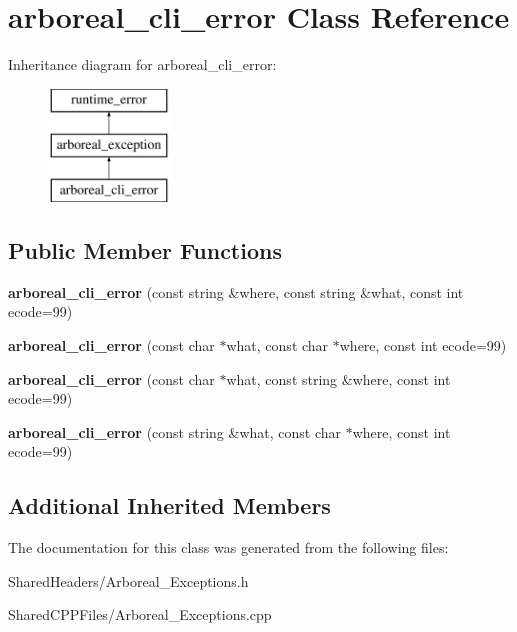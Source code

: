 \hypertarget{classarboreal__cli__error}{}\section{arboreal\+\_\+cli\+\_\+error Class Reference}
\label{classarboreal__cli__error}
Inheritance diagram for arboreal\+\_\+cli\+\_\+error\+:\begin{figure}[H]
\begin{center}
\leavevmode
\includegraphics[height=3.000000cm]{classarboreal__cli__error}
\end{center}
\end{figure}
\subsection*{Public Member Functions}
\begin{DoxyCompactItemize}
\item 
\mbox{\label{classarboreal__cli__error_a39291e6c997b531c712892b9623f938a}} 
{\bfseries arboreal\+\_\+cli\+\_\+error} (const string \&where, const string \&what, const int ecode=99)
\item 
\mbox{\label{classarboreal__cli__error_adecf3ae0818fcdff4d375ef12ea1659e}} 
{\bfseries arboreal\+\_\+cli\+\_\+error} (const char $\ast$what, const char $\ast$where, const int ecode=99)
\item 
\mbox{\label{classarboreal__cli__error_ab9388ea7e89c5232d7dd43d00019fef6}} 
{\bfseries arboreal\+\_\+cli\+\_\+error} (const char $\ast$what, const string \&where, const int ecode=99)
\item 
\mbox{\label{classarboreal__cli__error_a297adfc95de15ebdceae7cf364d05600}} 
{\bfseries arboreal\+\_\+cli\+\_\+error} (const string \&what, const char $\ast$where, const int ecode=99)
\end{DoxyCompactItemize}
\subsection*{Additional Inherited Members}


The documentation for this class was generated from the following files\+:\begin{DoxyCompactItemize}
\item 
Shared\+Headers/Arboreal\+\_\+\+Exceptions.\+h\item 
Shared\+C\+P\+P\+Files/Arboreal\+\_\+\+Exceptions.\+cpp\end{DoxyCompactItemize}

